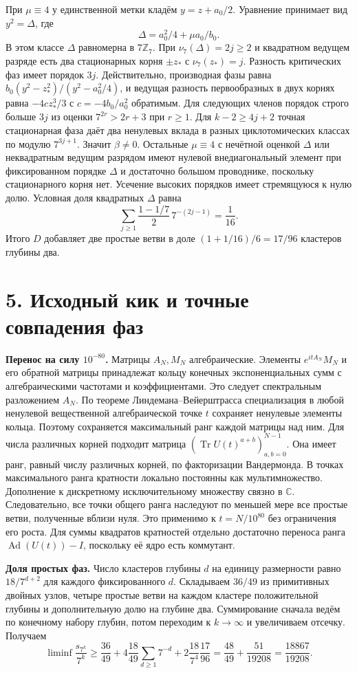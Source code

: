 \documentclass[11pt,a4paper]{article}
\newcommand{\Tr}{\operatorname{Tr}}
\newcommand{\Z}{\mathbb Z}
\newcommand{\sect}[1]{\section*{\sffamily\color{ink}#1}}
\newcommand{\subt}[1]{\par\medskip\noindent\textbf{#1.}\quad}
\newcommand{\Ad}{\operatorname{Ad}}
\begin{document}
При \(\mu\equiv4\) у единственной метки кладём \(y=z+a_0/2\). Уравнение принимает вид \(y^2=\Delta\), где
\[
         \Delta=a_0^2/4+\mu a_0/b_0 .
\]
В этом классе \(\Delta\) равномерна в \(7\Z_7\). При \(\nu_7(\Delta)=2j\ge2\) и квадратном ведущем разряде есть два стационарных корня \(\pm z_*\) с \(\nu_7(z_*)=j\). Разность критических фаз имеет порядок \(3j\). Действительно, производная фазы равна \(b_0(y^2-z_*^2)/(y^2-a_0^2/4)\), и ведущая разность первообразных в двух корнях равна \(-4c z_*^3/3\) с \(c=-4b_0/a_0^2\) обратимым. Для следующих членов порядок строго больше \(3j\) из оценки \(7^{2r}>2r+3\) при \(r\ge1\). Для \(k-2\ge4j+2\) точная стационарная фаза даёт два ненулевых вклада в разных циклотомических классах по модулю \(7^{3j+1}\). Значит \(\beta\ne0\). Остальные \(\mu\equiv4\) с нечётной оценкой \(\Delta\) или неквадратным ведущим разрядом имеют нулевой внедиагональный элемент при фиксированном порядке \(\Delta\) и достаточно большом проводнике, поскольку стационарного корня нет. Усечение высоких порядков имеет стремящуюся к нулю долю. Условная доля квадратных \(\Delta\) равна
\[
           \sum_{j\ge1}\frac{1-1/7}{2}\,7^{-(2j-1)}=\frac1{16}.
\]
Итого \(D\) добавляет две простые ветви в доле \((1+1/16)/6=17/96\) кластеров глубины два.

\newpage
\sect{5. Исходный кик и точные совпадения фаз}
\subt{Перенос на силу \(10^{-80}\)}
Матрицы \(A_N,M_N\) алгебраические. Элементы \(e^{itA_N}M_N\) и его обратной матрицы принадлежат кольцу конечных экспоненциальных сумм с алгебраическими частотами и коэффициентами. Это следует спектральным разложением \(A_N\). По теореме Линдемана--Вейерштрасса специализация в любой ненулевой вещественной алгебраической точке \(t\) сохраняет ненулевые элементы кольца. Поэтому сохраняется максимальный ранг каждой матрицы над ним. Для числа различных корней подходит матрица \((\Tr U(t)^{a+b})_{a,b=0}^{N-1}\). Она имеет ранг, равный числу различных корней, по факторизации Вандермонда. В точках максимального ранга кратности локально постоянны как мультимножество. Дополнение к дискретному исключительному множеству связно в \(\mathbb C\). Следовательно, все точки общего ранга наследуют по меньшей мере все простые ветви, полученные вблизи нуля. Это применимо к \(t=N/10^{80}\) без ограничения его роста. Для суммы квадратов кратностей отдельно достаточно переноса ранга \(\Ad(U(t))-I\), поскольку её ядро есть коммутант.

\subt{Доля простых фаз}
Число кластеров глубины \(d\) на единицу размерности равно \(18/7^{d+2}\) для каждого фиксированного \(d\). Складываем \(36/49\) из примитивных двойных узлов, четыре простые ветви на каждом кластере положительной глубины и дополнительную долю на глубине два. Суммирование сначала ведём по конечному набору глубин, потом переходим к \(k\to\infty\) и увеличиваем отсечку. Получаем
\[
 \liminf\frac{s_{7^k}}{7^k}\ge
 \frac{36}{49}
   +4\frac{18}{49}\sum_{d\ge1}7^{-d}
   +2\frac{18}{7^4}\frac{17}{96}
 =\frac{48}{49}+\frac{51}{19208}=\frac{18867}{19208}.
\]
\end{document}
